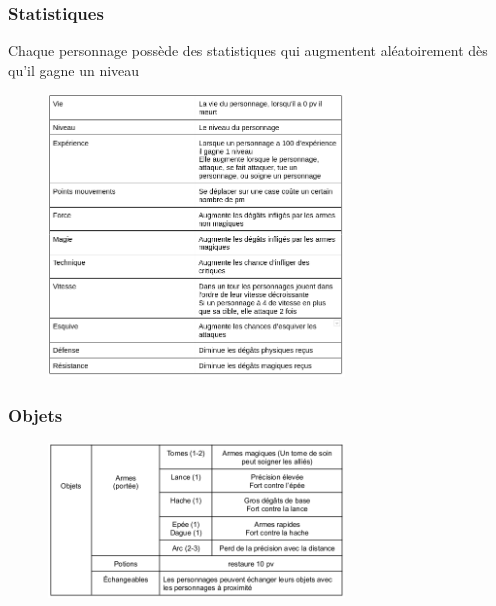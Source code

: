 \documentclass[a4paper,12pt]{article}
\begin{document}
\subsubsection{Statistiques}
Chaque personnage possède des statistiques qui augmentent aléatoirement dès qu’il gagne un niveau
\begin{figure}[ht]
\begin{center}
\includegraphics[width=0.7\textwidth]{tableaustats.png}
\end{center}
\end{figure}
\newpage
\subsubsection{Objets}
\begin{figure}[ht]
\begin{center}
\includegraphics[width=0.7\textwidth]{tableauobjets.png}
\end{center}
\end{figure}
\end{document}
